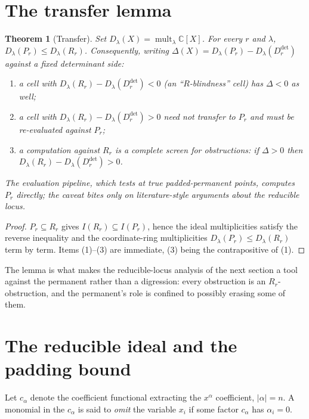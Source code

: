 \documentclass[11pt]{amsart}
\theoremstyle{plain}
\newtheorem{theorem}{Theorem}[section]
\theoremstyle{definition}
\theoremstyle{remark}
\DeclareMathOperator{\mult}{mult}
\newcommand{\bC}{\mathbb{C}}
\newcommand{\Rr}{R}
\newcommand{\Pp}{P}
\newcommand{\Ddet}{D^{\det}}
\begin{document}
\section{The transfer lemma}\label{sec:transfer}

\begin{theorem}[Transfer]\label{thm:transfer}
Set $D_\lambda(X)=\mult_\lambda\bC[X]$.  For every $r$ and $\lambda$,
$D_\lambda(\Pp_r)\le D_\lambda(\Rr_r)$.  Consequently, writing
$\Delta(X)=D_\lambda(\Pp_r)-D_\lambda(\Ddet_r)$ against a fixed determinant
side:
\begin{enumerate}
\item a cell with $D_\lambda(\Rr_r)-D_\lambda(\Ddet_r)<0$ (an
``$\Rr$-blindness'' cell) has $\Delta<0$ as well;
\item a cell with $D_\lambda(\Rr_r)-D_\lambda(\Ddet_r)>0$ need \emph{not}
transfer to $\Pp_r$ and must be re-evaluated against $\Pp_r$;
\item a computation against $\Rr_r$ is a complete screen for obstructions:
if $\Delta>0$ then $D_\lambda(\Rr_r)-D_\lambda(\Ddet_r)>0$.
\end{enumerate}
The evaluation pipeline, which tests at true padded-permanent points, computes
$\Pp_r$ directly; the caveat bites only on literature-style arguments about the
reducible locus.
\end{theorem}

\begin{proof}
$\Pp_r\subseteq\Rr_r$ gives $I(\Rr_r)\subseteq I(\Pp_r)$, hence the ideal
multiplicities satisfy the reverse inequality and the coordinate-ring
multiplicities $D_\lambda(\Pp_r)\le D_\lambda(\Rr_r)$ term by term.  Items
(1)--(3) are immediate, (3) being the contrapositive of (1).
\end{proof}

The lemma is what makes the reducible-locus analysis of the next section a tool
against the permanent rather than a digression: every obstruction is an
$\Rr_r$-obstruction, and the permanent's role is confined to possibly erasing
some of them.

\section{The reducible ideal and the padding bound}\label{sec:reducible}

Let $c_\alpha$ denote the coefficient functional extracting the $x^\alpha$
coefficient, $|\alpha|=n$.  A monomial in the $c_\alpha$ is said to
\emph{omit} the variable $x_i$ if some factor $c_\alpha$ has $\alpha_i=0$.
\end{document}

